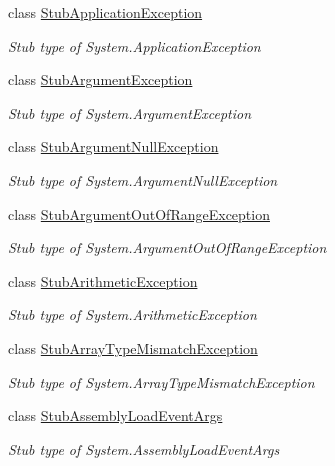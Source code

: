 \begin{DoxyCompactItemize}
class \hyperlink{class_system_1_1_fakes_1_1_stub_application_exception}{Stub\-Application\-Exception}
\begin{DoxyCompactList}\small\item\em Stub type of System.\-Application\-Exception\end{DoxyCompactList}\item 
class \hyperlink{class_system_1_1_fakes_1_1_stub_argument_exception}{Stub\-Argument\-Exception}
\begin{DoxyCompactList}\small\item\em Stub type of System.\-Argument\-Exception\end{DoxyCompactList}\item 
class \hyperlink{class_system_1_1_fakes_1_1_stub_argument_null_exception}{Stub\-Argument\-Null\-Exception}
\begin{DoxyCompactList}\small\item\em Stub type of System.\-Argument\-Null\-Exception\end{DoxyCompactList}\item 
class \hyperlink{class_system_1_1_fakes_1_1_stub_argument_out_of_range_exception}{Stub\-Argument\-Out\-Of\-Range\-Exception}
\begin{DoxyCompactList}\small\item\em Stub type of System.\-Argument\-Out\-Of\-Range\-Exception\end{DoxyCompactList}\item 
class \hyperlink{class_system_1_1_fakes_1_1_stub_arithmetic_exception}{Stub\-Arithmetic\-Exception}
\begin{DoxyCompactList}\small\item\em Stub type of System.\-Arithmetic\-Exception\end{DoxyCompactList}\item 
class \hyperlink{class_system_1_1_fakes_1_1_stub_array_type_mismatch_exception}{Stub\-Array\-Type\-Mismatch\-Exception}
\begin{DoxyCompactList}\small\item\em Stub type of System.\-Array\-Type\-Mismatch\-Exception\end{DoxyCompactList}\item 
class \hyperlink{class_system_1_1_fakes_1_1_stub_assembly_load_event_args}{Stub\-Assembly\-Load\-Event\-Args}
\begin{DoxyCompactList}\small\item\em Stub type of System.\-Assembly\-Load\-Event\-Args\end{DoxyCompactList}\item 

\end{DoxyCompactItemize}
